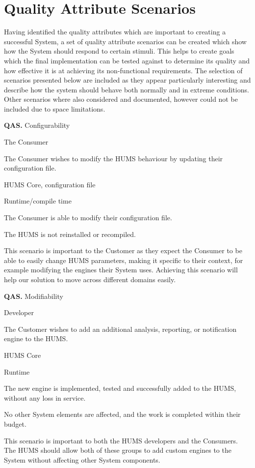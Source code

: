 \documentclass[10pt,a4paper]{article}
\newcommand{\qas}[1]{\textcolor{reqColor}{\textbf{QAS.#1}}}
\newenvironment{scenario}[1]{
\newcommand{\source}[1]{\item[Source of Stimulus:] ##1}
\newcommand{\stimulus}[1]{\item[Stimulus:] ##1}
\newcommand{\artifact}[1]{\item[Artifact:] ##1}
\newcommand{\environment}[1]{\item[Environment:] ##1}
\newcommand{\response}[1]{\item[Response:] ##1}
\newcommand{\measure}[1]{\item[Response Measure:] ##1}
\newcommand{\rationale}[1]{\item[Scenario Rationale:] ##1}
\newcommand{\quality}[1]{\item[Quality:] ##1}
		\begin{description} [noitemsep]	
		\item[Scenario ID:] \qas{#1}
		}{\end{description} \vspace*{0.3cm}
		}
\begin{document}
\section{Quality Attribute Scenarios}
\label{sec:scenarios}
Having identified the quality attributes which are important to creating a successful System, a set of quality attribute scenarios can be created which show how the System should respond to certain stimuli. This helps to create goals which the final implementation can be tested against to determine its quality and how effective it is at achieving its non-functional requirements. The selection of scenarios presented below are included as they appear particularly interesting and describe how the system should behave both normally and in extreme conditions. Other scenarios where also considered and documented, however could not be included due to space limitations.

\begin{scenario}{1}
\quality{Configurability}
\source{The Consumer}
\stimulus{The Consumer wishes to modify the HUMS behaviour by updating their configuration file.}
\artifact{HUMS Core, configuration file}
\environment{Runtime/compile time}
\response{The Consumer is able to modify their configuration file.}
\measure{The HUMS is not reinstalled or recompiled.}
\rationale{This scenario is important to the Customer as they expect the Consumer to be able to easily change HUMS parameters, making it specific to their context, for example modifying the engines their System uses. Achieving this scenario will help our solution to move across different domains easily.}
\end{scenario}

\begin{scenario}{2}
\quality{Modifiability}
\source{Developer}
\stimulus{The Customer wishes to add an additional analysis, reporting, or notification engine to the HUMS.}
\artifact{HUMS Core}
\environment{Runtime}
\response{The new engine is implemented, tested and successfully added to the HUMS, without any loss in service.}
\measure{No other System elements are affected, and the work is completed within their budget.}
\rationale{This scenario is important to both the HUMS developers and the Consumers. The HUMS should allow both of these groups to add custom engines to the System without affecting other System components.}
\end{scenario}
\end{document}
